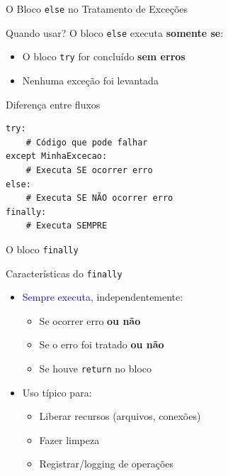 \begin{frame}[fragile]{O Bloco \texttt{else} no Tratamento de Exceções}
    \begin{block}{Quando usar?}
        O bloco \texttt{else} executa \textbf{somente se}:
        \begin{itemize}
            \item O bloco \texttt{try} for concluído \textbf{sem erros}
            \item Nenhuma exceção foi levantada
        \end{itemize}
    \end{block}

    \begin{block}{Diferença entre fluxos}
        \begin{verbatim}
try:
    # Código que pode falhar
except MinhaExcecao:
    # Executa SE ocorrer erro
else:
    # Executa SE NÃO ocorrer erro
finally:
    # Executa SEMPRE
\end{verbatim}
    \end{block}


\end{frame}



\begin{frame}{O bloco \texttt{finally}}
    \begin{block}{Características do \texttt{finally}}
        \begin{itemize}
            \item \textcolor{blue}{Sempre executa}, independentemente:
                  \begin{itemize}
                      \item Se ocorrer erro \textbf{ou não}
                      \item Se o erro foi tratado \textbf{ou não}
                      \item Se houve \texttt{return} no bloco
                  \end{itemize}

            \item Uso típico para:
                  \begin{itemize}
                      \item Liberar recursos (arquivos, conexões)
                      \item Fazer limpeza
                      \item Registrar/logging de operações
                  \end{itemize}
        \end{itemize}
    \end{block}


\end{frame}


